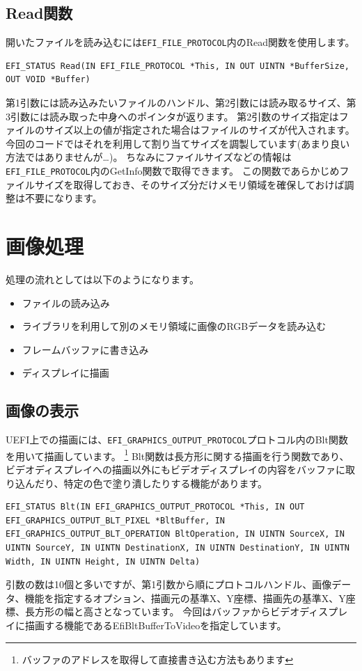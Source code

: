 \documentclass[10pt,b5paper,twoside,openany]{ltjsbook}
\begin{document}
\subsection{Read関数}
開いたファイルを読み込むには\verb+EFI_FILE_PROTOCOL+内のRead関数を使用します。
\begin{lstlisting}[style=customC]
    EFI_STATUS Read(IN EFI_FILE_PROTOCOL *This, IN OUT UINTN *BufferSize, OUT VOID *Buffer)
\end{lstlisting}
第1引数には読み込みたいファイルのハンドル、第2引数には読み取るサイズ、第3引数には読み取った中身へのポインタが返ります。
第2引数のサイズ指定はファイルのサイズ以上の値が指定された場合はファイルのサイズが代入されます。
今回のコードではそれを利用して割り当てサイズを調製しています(あまり良い方法ではありませんが…)。
ちなみにファイルサイズなどの情報は\verb+EFI_FILE_PROTOCOL+内のGetInfo関数で取得できます。
この関数であらかじめファイルサイズを取得しておき、そのサイズ分だけメモリ領域を確保しておけば調整は不要になります。

\section{画像処理}
処理の流れとしては以下のようになります。
\begin{itemize}
    \item ファイルの読み込み
    \item ライブラリを利用して別のメモリ領域に画像のRGBデータを読み込む
    \item フレームバッファに書き込み
    \item ディスプレイに描画
\end{itemize}

\subsection{画像の表示}
UEFI上での描画には、\verb+EFI_GRAPHICS_OUTPUT_PROTOCOL+プロトコル内のBlt関数を用いて描画しています。
\footnote{バッファのアドレスを取得して直接書き込む方法もあります}
Blt関数は長方形に関する描画を行う関数であり、ビデオディスプレイへの描画以外にもビデオディスプレイの内容をバッファに取り込んだり、特定の色で塗り潰したりする機能があります。
\begin{lstlisting}[style=customC]
EFI_STATUS Blt(IN EFI_GRAPHICS_OUTPUT_PROTOCOL *This, IN OUT EFI_GRAPHICS_OUTPUT_BLT_PIXEL *BltBuffer, IN EFI_GRAPHICS_OUTPUT_BLT_OPERATION BltOperation, IN UINTN SourceX, IN UINTN SourceY, IN UINTN DestinationX, IN UINTN DestinationY, IN UINTN Width, IN UINTN Height, IN UINTN Delta)
\end{lstlisting}
引数の数は10個と多いですが、第1引数から順にプロトコルハンドル、画像データ、機能を指定するオプション、描画元の基準X、Y座標、描画先の基準X、Y座標、長方形の幅と高さとなっています。
今回はバッファからビデオディスプレイに描画する機能であるEfiBltBufferToVideoを指定しています。
\end{document}
